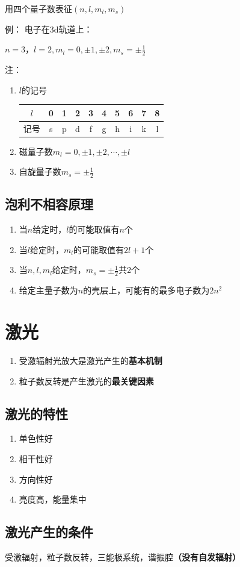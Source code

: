 \documentclass{ctexart}
\begin{document}
用四个量子数表征$(n,l,m_l,m_s)$

例： 电子在3d轨道上：

$n=3，l=2,m_l=0,\pm 1,\pm 2, m_s=\pm \frac{1}{2}$

注：
\begin{enumerate}
	\item $l$的记号
	\begin{tabular}{c|c|c|c|c|c|c|c|c|c}
	$l$& 0 & 1 & 2 & 3 & 4 & 5 & 6 & 7 & 8 \\
	\hline
	记号& s &  p &  d & f & g & h & i & k & l\\
	\end{tabular}
	\item 磁量子数$m_l=0,\pm 1,\pm 2,\cdots,\pm l$
	\item 自旋量子数$m_s=\pm \frac{1}{2}$
\end{enumerate}

\subsection{泡利不相容原理}

\begin{enumerate}
	\item 当$n$给定时，$l$的可能取值有$n$个
	\item 当$l$给定时，$m_l$的可能取值有$2l+1$个
	\item 当$n,l,m_l$给定时，$m_s=\pm \frac{1}{2}$共2个
	\item 给定主量子数为$n$的壳层上，可能有的最多电子数为$2n^2$
\end{enumerate}

\section{激光}

\begin{enumerate}
	\item 受激辐射光放大是激光产生的\textbf{基本机制}
	\item 粒子数反转是产生激光的\textbf{最关键因素}
\end{enumerate}

\subsection*{激光的特性}

\begin{enumerate}
	\item 单色性好
	\item 相干性好
	\item 方向性好
	\item 亮度高，能量集中
\end{enumerate}

\subsection*{激光产生的条件}

受激辐射，粒子数反转，三能极系统，谐振腔\textbf{（没有自发辐射）}
\end{document}
